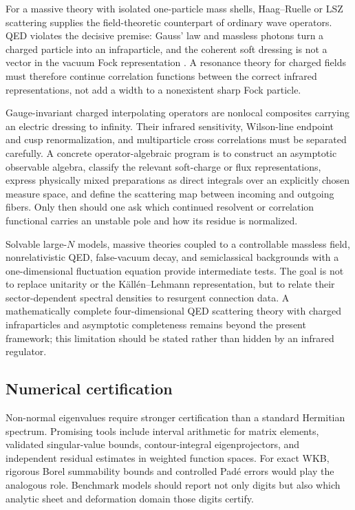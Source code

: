 For a massive theory with isolated one-particle mass shells, Haag--Ruelle or
LSZ scattering supplies the field-theoretic counterpart of ordinary wave
operators.  QED violates the decisive premise: Gauss' law and massless photons
turn a charged particle into an infraparticle, and the coherent soft dressing
is not a vector in the vacuum Fock representation
\cite{KulishFaddeev:1970,Buchholz:1986,ChenFrohlichPizzo:2010}.  A resonance
theory for charged fields must therefore continue correlation functions
between the correct infrared representations, not add a width to a
nonexistent sharp Fock particle.

Gauge-invariant charged interpolating operators are nonlocal composites
carrying an electric dressing to infinity.  Their infrared sensitivity,
Wilson-line endpoint and cusp renormalization, and multiparticle cross
correlations must be separated carefully.  A concrete operator-algebraic
program is to construct an asymptotic observable algebra, classify the
relevant soft-charge or flux representations, express physically mixed
preparations as direct integrals over an explicitly chosen measure space, and
define the scattering map between incoming and outgoing fibers.  Only then
should one ask which continued resolvent or correlation functional carries an
unstable pole and how its residue is normalized.

Solvable large-$N$ models, massive theories coupled to a controllable massless
field, nonrelativistic QED, false-vacuum decay, and semiclassical backgrounds
with a one-dimensional fluctuation equation provide intermediate tests.  The
goal is not to replace unitarity or the K\"all\'en--Lehmann representation, but
to relate their sector-dependent spectral densities to resurgent connection
data.  A mathematically complete four-dimensional QED scattering theory with
charged infraparticles and asymptotic completeness remains beyond the present
framework; this limitation should be stated rather than hidden by an infrared
regulator.

\subsection{Numerical certification}
\label{subsec:open-certification}

Non-normal eigenvalues require stronger certification than a standard
Hermitian spectrum.  Promising tools include interval arithmetic for matrix
elements, validated singular-value bounds, contour-integral eigenprojectors,
and independent residual estimates in weighted function spaces.  For exact
WKB, rigorous Borel summability bounds and controlled Pad\'e errors would play
the analogous role.  Benchmark models should report not only digits but also
which analytic sheet and deformation domain those digits certify.
